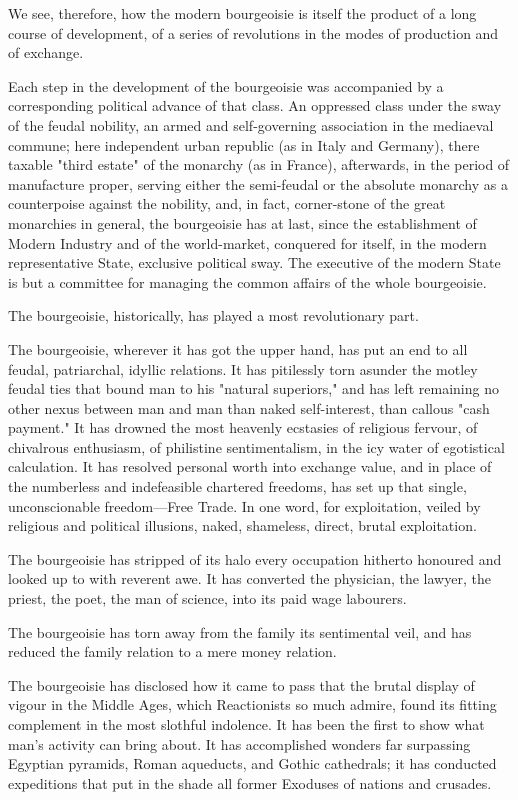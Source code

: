 \documentclass[, oneside]{article}   	%
\begin{document}
We see, therefore, how the modern bourgeoisie is itself the product of a long course of development, of a series of revolutions in the modes of production and of exchange.

Each step in the development of the bourgeoisie was accompanied by a corresponding political advance of that class. An oppressed class under the sway of the feudal nobility, an armed and self-governing association in the mediaeval commune; here independent urban republic (as in Italy and Germany), there taxable "third estate" of the monarchy (as in France), afterwards, in the period of manufacture proper, serving either the semi-feudal or the absolute monarchy as a counterpoise against the nobility, and, in fact, corner-stone of the great monarchies in general, the bourgeoisie has at last, since the establishment of Modern Industry and of the world-market, conquered for itself, in the modern representative State, exclusive political sway. The executive of the modern State is but a committee for managing the common affairs of the whole bourgeoisie.

The bourgeoisie, historically, has played a most revolutionary part.

The bourgeoisie, wherever it has got the upper hand, has put an end to all feudal, patriarchal, idyllic relations. It has pitilessly torn asunder the motley feudal ties that bound man to his "natural superiors," and has left remaining no other nexus between man and man than naked self-interest, than callous "cash payment." It has drowned the most heavenly ecstasies of religious fervour, of chivalrous enthusiasm, of philistine sentimentalism, in the icy water of egotistical calculation. It has resolved personal worth into exchange value, and in place of the numberless and indefeasible chartered freedoms, has set up that single, unconscionable freedom—Free Trade. In one word, for exploitation, veiled by religious and political illusions, naked, shameless, direct, brutal exploitation.

The bourgeoisie has stripped of its halo every occupation hitherto honoured and looked up to with reverent awe. It has converted the physician, the lawyer, the priest, the poet, the man of science, into its paid wage labourers.

The bourgeoisie has torn away from the family its sentimental veil, and has reduced the family relation to a mere money relation.

The bourgeoisie has disclosed how it came to pass that the brutal display of vigour in the Middle Ages, which Reactionists so much admire, found its fitting complement in the most slothful indolence. It has been the first to show what man's activity can bring about. It has accomplished wonders far surpassing Egyptian pyramids, Roman aqueducts, and Gothic cathedrals; it has conducted expeditions that put in the shade all former Exoduses of nations and crusades.
\end{document}
